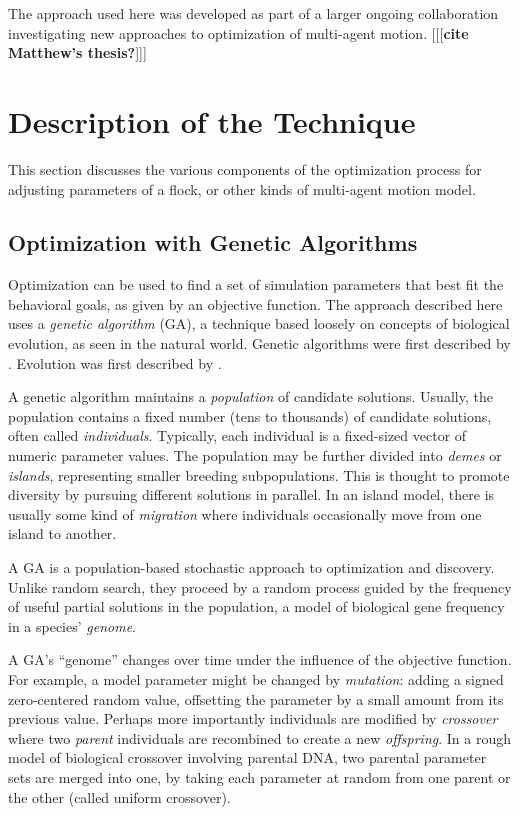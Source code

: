 \documentclass[letterpaper]{article}
\begin{document}
The approach used here was developed as part of a larger ongoing collaboration investigating new approaches to optimization of multi-agent motion. [[[\textbf{cite Matthew's thesis?}]]]

\section{Description of the Technique}
\label{sec:Description}

This section discusses the various components of the optimization process for adjusting parameters of a flock, or other kinds of multi-agent motion model.

\subsection{Optimization with Genetic Algorithms}
\label{subsec:Optimization_with_GA}

Optimization can be used to find a set of simulation parameters that best fit the behavioral goals, as given by an objective function. The approach described here uses a \textit{genetic algorithm} (GA), a technique based loosely on concepts of biological evolution, as seen in the natural world. Genetic algorithms were first described by \citet{holland_adaptation_1975}. Evolution was first described by \citet{darwin_origin_1859}.

A genetic algorithm maintains a \textit{population} of candidate solutions. Usually, the population contains a fixed number (tens to thousands) of candidate solutions, often called \textit{individuals}. Typically, each individual is a fixed-sized vector of numeric parameter values. The population may be further divided into \textit{demes} or \textit{islands}, representing smaller breeding subpopulations. This is thought to promote diversity by pursuing different solutions in parallel. In an island model, there is usually some kind of \textit{migration} where individuals occasionally move from one island to another.

A GA is a population-based stochastic approach to optimization and discovery. Unlike random search, they proceed by a random process guided by the frequency of useful partial solutions in the population, a model of biological gene frequency in a species' \textit{genome}.

A GA's ``genome'' changes over time under the influence of the objective function. For example, a model parameter might be changed by \textit{mutation}: adding a signed zero-centered random value, offsetting the parameter by a small amount from its previous value. Perhaps more importantly individuals are modified by \textit{crossover} where two \textit{parent} individuals are recombined to create a new \textit{offspring}. In a rough model of biological crossover involving parental DNA, two parental parameter sets are merged into one, by taking each parameter at random from one parent or the other (called uniform crossover).
\end{document}

